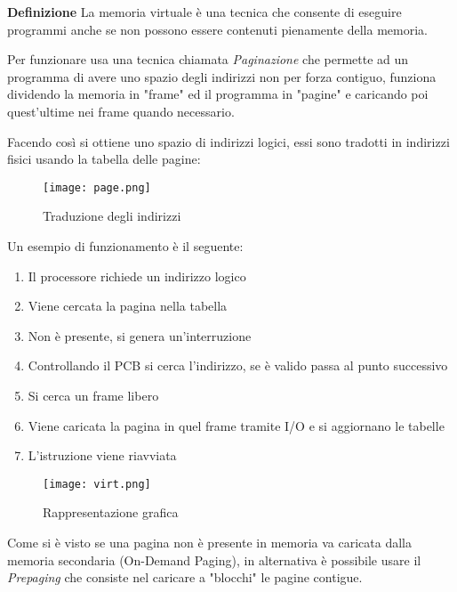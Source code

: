\documentclass{article}
\begin{document}
\textbf{Definizione} La memoria virtuale è una tecnica che consente di eseguire programmi anche se non possono essere contenuti pienamente della memoria.\newline

\noindent Per funzionare usa una tecnica chiamata \textit{Paginazione} che permette ad un programma di avere uno spazio degli indirizzi non per forza contiguo, funziona dividendo la memoria in "frame" ed il programma in "pagine" e caricando poi quest'ultime nei frame quando necessario.\newline

\noindent Facendo così si ottiene uno spazio di indirizzi logici, essi sono tradotti in indirizzi fisici usando la tabella delle pagine:

\begin{figure}[ht]
    \centering
    \texttt{[image: page.png]}
    \caption{Traduzione degli indirizzi}
    \label{fig:virt_page}
\end{figure}

\newpage

\noindent Un esempio di funzionamento è il seguente:
\begin{enumerate}
    \item Il processore richiede un indirizzo logico
    \item Viene cercata la pagina nella tabella
    \item Non è presente, si genera un'interruzione
    \item Controllando il PCB si cerca l'indirizzo, se è valido passa al punto successivo
    \item Si cerca un frame libero
    \item Viene caricata la pagina in quel frame tramite I/O e si aggiornano le tabelle
    \item L'istruzione viene riavviata
\end{enumerate}

\begin{figure}[ht]
    \centering
    \texttt{[image: virt.png]}
    \caption{Rappresentazione grafica}
    \label{fig:virt}
\end{figure}

\noindent Come si è visto se una pagina non è presente in memoria va caricata dalla memoria secondaria (On-Demand Paging), in alternativa è possibile usare il \textit{Prepaging} che consiste nel caricare a "blocchi" le pagine contigue.\newline
\end{document}
